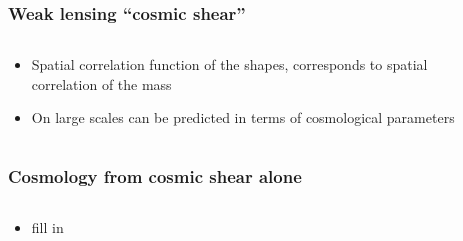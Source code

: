 \documentclass{beamer}
\begin{document}
\frame
{
    \frametitle{Weak lensing ``cosmic shear''}


    \begin{columns}
        \begin{column}{0.5\textwidth}    
            \begin{itemize}

                \item Spatial correlation function of the shapes, corresponds to
                    spatial correlation of the mass

                \item On large scales can be predicted in terms of cosmological
                    parameters

            \end{itemize}
        \end{column}
        \begin{column}{0.5\textwidth}
        \end{column}
    \end{columns}

}

\frame
{
    \frametitle{Cosmology from cosmic shear alone}


    \begin{columns}
        \begin{column}{0.5\textwidth}    
            \begin{itemize}

                \item fill in

            \end{itemize}
        \end{column}
        \begin{column}{0.5\textwidth}
        \end{column}
    \end{columns}

}
\end{document}
